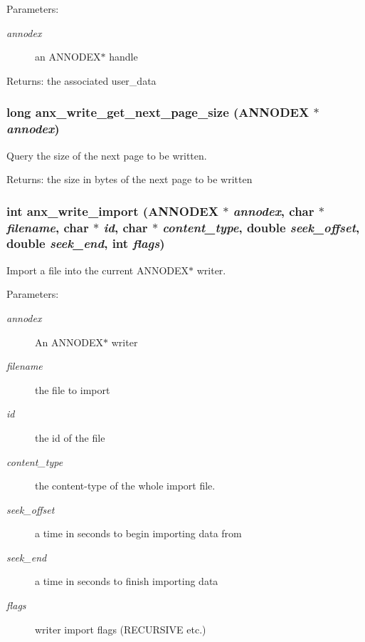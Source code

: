 \begin{Desc}
\item[Parameters:]
\begin{description}
\item[{\em annodex}]an ANNODEX$\ast$ handle \end{description}
\end{Desc}
\begin{Desc}
\item[Returns:]the associated user\_\-data \end{Desc}
\subsubsection{\setlength{\rightskip}{0pt plus 5cm}long anx\_\-write\_\-get\_\-next\_\-page\_\-size ({\bf ANNODEX} $\ast$ {\em annodex})}\label{anx__write_8h_a1}


Query the size of the next page to be written. 

\begin{Desc}
\item[Returns:]the size in bytes of the next page to be written \end{Desc}
\subsubsection{\setlength{\rightskip}{0pt plus 5cm}int anx\_\-write\_\-import ({\bf ANNODEX} $\ast$ {\em annodex}, char $\ast$ {\em filename}, char $\ast$ {\em id}, char $\ast$ {\em content\_\-type}, double {\em seek\_\-offset}, double {\em seek\_\-end}, int {\em flags})}\label{anx__write_8h_a2}


Import a file into the current ANNODEX$\ast$ writer. 

\begin{Desc}
\item[Parameters:]
\begin{description}
\item[{\em annodex}]An ANNODEX$\ast$ writer \item[{\em filename}]the file to import \item[{\em id}]the id of the file \item[{\em content\_\-type}]the content-type of the whole import file. \item[{\em seek\_\-offset}]a time in seconds to begin importing data from \item[{\em seek\_\-end}]a time in seconds to finish importing data \item[{\em flags}]writer import flags (RECURSIVE etc.) \end{description}
\end{Desc}
